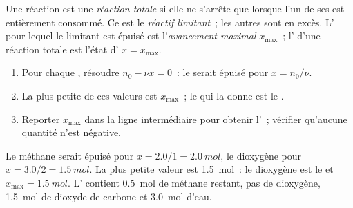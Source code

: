 \begin{definition}\label{def:g10:reaction-progress-table:limiting}
Une réaction est une \emph{réaction totale} si
elle ne s'arrête que lorsque l'un de ses  est entièrement
consommé. Ce  est le \emph{réactif limitant}~;
les autres  sont en excès. L' pour lequel le 
limitant est épuisé est l'\emph{avancement maximal}
$x_{\max}$~; l' d'une réaction totale est l'état
d' $x = x_{\max}$.
\end{definition}

\begin{method}\label{met:g10:reaction-progress-table:limiting}
\begin{enumerate}
  \item Pour chaque , résoudre $n_0 - \nu x = 0$~: le 
        serait épuisé pour $x = n_0 / \nu$.
  \item La plus petite de ces valeurs est $x_{\max}$~; le  qui la
        donne est le .
  \item Reporter $x_{\max}$ dans la ligne intermédiaire pour obtenir
        l'~; vérifier qu'aucune quantité n'est négative.
\end{enumerate}
\end{method}

\begin{example}\label{ex:g10:reaction-progress-table:methane-final}
Le méthane serait épuisé pour $x = 2.0/1 = \qty{2.0}{mol}$, le
dioxygène pour $x = 3.0/2 = \qty{1.5}{mol}$. La plus petite valeur est
\qty{1.5}{mol}~: le dioxygène est le  et
$x_{\max} = \qty{1.5}{mol}$. L' contient \qty{0.5}{mol} de
méthane restant, pas de dioxygène, \qty{1.5}{mol} de dioxyde de
carbone et \qty{3.0}{mol} d'eau.
\end{example}

